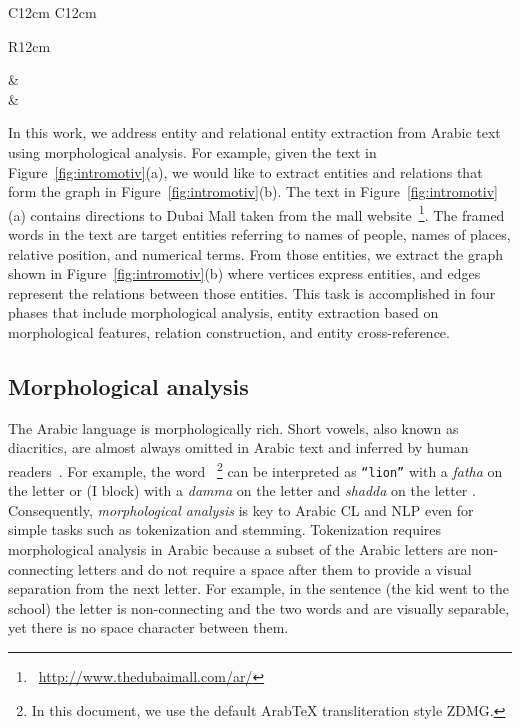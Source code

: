\begin{figure*}[tb]
{\begin{tabular}{C{12cm} C{12cm}}
\begin{tabular}{R{12cm}}
  \\
  \end{tabular}
&
  \\
 &
 \\
    \end{tabular}
}
  \caption{Text, formula, and match \framework example}
  \label{fig:intromotiv}
\end{figure*}
\transtrue
{}

In this work, we address entity and relational entity extraction from Arabic text using morphological analysis. 
For example, given the text in Figure~\ref{fig:intromotiv}(a), we would like to extract entities and relations that form the graph in Figure~\ref{fig:intromotiv}(b). 
The text in Figure~\ref{fig:intromotiv}(a) contains directions to Dubai Mall taken from the mall website~\footnote{~\url{http://www.thedubaimall.com/ar/}}. 
The framed words in the text are target entities referring to names of people, 
names of places, relative position, and numerical terms. 
From those entities, we extract the graph shown in Figure~\ref{fig:intromotiv}(b) where vertices express entities, and edges represent the relations between those entities. 
This task is accomplished in four phases that include morphological analysis, entity extraction based on morphological features, relation construction, and entity cross-reference.

\subsection*{Morphological analysis}

The Arabic language is morphologically rich. 
Short vowels, also known as diacritics, are almost always omitted in Arabic text
and inferred by human readers~\cite{habash2006arabic}. 
For example, the word %
                              ~\footnote{In this document, we use the default ArabTeX transliteration style ZDMG.}
can be interpreted as  {\tt ``lion''} with a {\em fatha} on the letter  or 
\vocalize {} (I block) with a 
{\em damma} on the letter  and {\em shadda} on the letter .
Consequently, {\em morphological analysis} is key to Arabic CL and NLP 
even for simple tasks 
such as tokenization and stemming\cite{arabicmorph}.
Tokenization requires morphological analysis in Arabic because a subset of the Arabic letters are 
non-connecting letters and do not require a space after them to provide a visual separation 
from the next letter. 
For example, in the sentence  (the kid went to the school)
\transfalse
the letter  is non-connecting and the two words 
 and 
are visually separable, 
yet there is no space character between them. 
\transtrue

